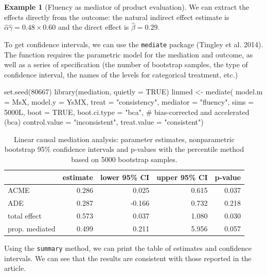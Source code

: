 \documentclass[
  11pt,
  letterpaper,
]{scrbook}
\newenvironment{Shaded}{\begin{snugshade}}{\end{snugshade}}
\newcommand{\AttributeTok}[1]{\textcolor[rgb]{0.40,0.45,0.13}{#1}}
\newcommand{\CommentTok}[1]{\textcolor[rgb]{0.37,0.37,0.37}{#1}}
\newcommand{\ConstantTok}[1]{\textcolor[rgb]{0.56,0.35,0.01}{#1}}
\newcommand{\DecValTok}[1]{\textcolor[rgb]{0.68,0.00,0.00}{#1}}
\newcommand{\FunctionTok}[1]{\textcolor[rgb]{0.28,0.35,0.67}{#1}}
\newcommand{\NormalTok}[1]{\textcolor[rgb]{0.00,0.23,0.31}{#1}}
\newcommand{\OtherTok}[1]{\textcolor[rgb]{0.00,0.23,0.31}{#1}}
\newcommand{\StringTok}[1]{\textcolor[rgb]{0.13,0.47,0.30}{#1}}
\theoremstyle{definition}
\newtheorem{example}{Example}[chapter]
\theoremstyle{remark}
\begin{document}
\begin{example}[Fluency as mediator of product
evaluation]
We can extract the effects directly from the outcome: the natural
indirect effect estimate is
\(\widehat{\alpha}\widehat{\gamma} = 0.48 \times 0.60\) and the direct
effect is \(\widehat{\beta} = 0.29\).

To get confidence intervals, we can use the \texttt{mediate} package
(Tingley et al. 2014). The function requires the parametric model for
the mediation and outcome, as well as a series of specification (the
number of bootstrap samples, the type of confidence interval, the names
of the levels for categorical treatment, etc.)

\begin{Shaded}
\begin{Highlighting}[]
\FunctionTok{set.seed}\NormalTok{(}\DecValTok{80667}\NormalTok{)}
\FunctionTok{library}\NormalTok{(mediation, }\AttributeTok{quietly =} \ConstantTok{TRUE}\NormalTok{)}
\NormalTok{linmed }\OtherTok{\textless{}{-}} \FunctionTok{mediate}\NormalTok{(}
  \AttributeTok{model.m =}\NormalTok{ MsX,}
  \AttributeTok{model.y =}\NormalTok{ YsMX,}
  \AttributeTok{treat =} \StringTok{"consistency"}\NormalTok{,}
  \AttributeTok{mediator =} \StringTok{"fluency"}\NormalTok{,}
  \AttributeTok{sims =}\NormalTok{ 5000L,}
  \AttributeTok{boot =} \ConstantTok{TRUE}\NormalTok{,}
  \AttributeTok{boot.ci.type =} \StringTok{"bca"}\NormalTok{, }\CommentTok{\# bias{-}corrected and accelerated (bca)}
  \AttributeTok{control.value =} \StringTok{"inconsistent"}\NormalTok{,}
  \AttributeTok{treat.value =} \StringTok{"consistent"}\NormalTok{)}
\end{Highlighting}
\end{Shaded}

\hypertarget{tbl-mediation}{}
\begin{table}
\caption{\label{tbl-mediation}Linear causal mediation analysis: parameter estimates, nonparametric
bootstrap 95\% confidence intervals and p-values with the percentile
method based on 5000 bootstrap samples. }\tabularnewline

\centering
\begin{tabular}{lrrrr}
\toprule
  & estimate & lower 95\% CI & upper 95\% CI & p-value\\
\midrule
ACME & 0.286 & 0.025 & 0.615 & 0.037\\
ADE & 0.287 & -0.166 & 0.732 & 0.218\\
total effect & 0.573 & 0.037 & 1.080 & 0.030\\
prop. mediated & 0.499 & 0.211 & 5.956 & 0.057\\
\bottomrule
\end{tabular}
\end{table}

Using the \texttt{summary} method, we can print the table of estimates
and confidence intervals. We can see that the results are consistent
with those reported in the article.

\end{example}
\end{document}
